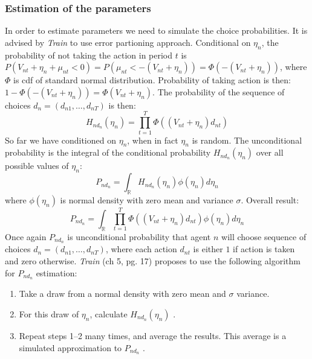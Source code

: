\documentclass[11pt,a4paper]{article}
\begin{document}
\subsubsection*{Estimation of the parameters}
In order to estimate parameters we need to simulate the choice
probabilities. It is advised by \textit{Train} to use error
partioning approach. Conditional on $ \eta_n $, the probability
of not taking the action in period $ t $ is
$ P(V_{nt} + \eta_n + \mu_{nt} < 0) = P(\mu_{nt} < -(V_{nt} + \eta_n )) =
    \Phi(-(V_{nt} + \eta_n))$, where $ \Phi $ is cdf of standard normal
distribution. Probability of taking action is then:
$1 - \Phi(-(V_{nt} + \eta_n)) = \Phi(V_{nt} + \eta_n)$.
The probability of the sequence of choices $ d_n = (d_{n1}, \dots, d_{nT}) $
is then:
$$
    H_{nd_n}(\eta_n) = \prod_{t=1}^{T}\Phi((V_{nt} + \eta_n)d_{nt})
$$
So far we have conditioned on $ \eta_n $, when in fact $ \eta_n $
is random. The unconditional probability is the integral of the
conditional probability $ H_{nd_n}(\eta_n) $ over all possible
values of $ \eta_n $:
$$ P_{nd_n} = \int_{\mathbb{R}}  H_{nd_n}(\eta_n) \phi(\eta_n)d\eta_n$$
where $ \phi (\eta_n) $ is normal density with zero mean and
variance $ \sigma $. Overall result:
$$
    P_{nd_n} = \int_{\mathbb{R}}  \prod_{t=1}^{T}\Phi((V_{nt} + \eta_n)d_{nt}) \phi(\eta_n)d\eta_n
$$
Once again $ P_{nd_n} $ is unconditional probability that agent
$ n $ will choose sequence of choices $ d_n = (d_{n1}, \dots, d_{nT}) $,
where each action $ d_{nt} $ is either $ 1 $ if action is taken and
zero otherwise. \textit{Train} (ch 5, pg. 17) proposes to use the
following algorithm for $ P_{nd_n} $ estimation:
\begin{enumerate}[itemsep=0em]
    \item Take a draw from a normal density with zero mean
          and $ \sigma $ variance.
    \item For this draw of $ \eta_n $, calculate $ H_{nd_n}(\eta_n) $ .
    \item Repeat steps 1–2 many times, and average the results.
          This average is a simulated approximation to $ P_{nd_n} $ .
\end{enumerate}
\end{document}

